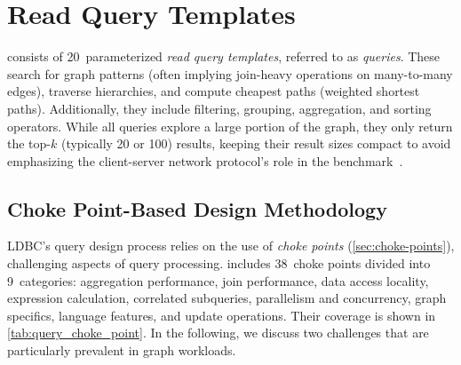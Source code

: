 \section{Read Query Templates}
\label{sec:queries}


\snbbi consists of 20~parameterized \emph{read query templates}, referred to as \emph{queries}. These search for graph patterns (often implying join-heavy operations on many-to-many edges), traverse hierarchies, and compute cheapest paths (\aka weighted shortest paths).
Additionally, they include filtering, grouping, aggregation, and sorting operators.
While all queries explore a large portion of the graph, they only return the top-$k$ (typically 20 or 100) results,
keeping their result sizes compact to avoid emphasizing the client-server network protocol's role in the benchmark~\cite{DBLP:journals/pvldb/RaasveldtM17}.

\subsection{Choke Point-Based Design Methodology}

LDBC's query design process relies on the use of \emph{choke points} (\autoref{sec:choke-points}),
\ie challenging aspects of query processing.
\snbbi includes 38~choke points divided into 9~categories:
aggregation performance,
join performance,
data access locality,
expression calculation,
correlated subqueries,
parallelism and concurrency,
graph specifics,
language features,
and
update operations.
Their coverage is shown in \autoref{tab:query_choke_point}.
In the following, we discuss two challenges that are particularly prevalent in graph workloads.


